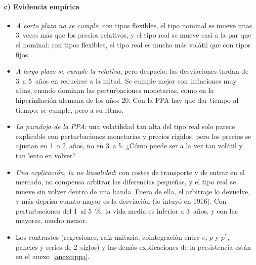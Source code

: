 \documentclass[11pt]{article}
\begin{document}
\paragraph{c) Evidencia empírica}
\begin{itemize}
\item \emph{A corto plazo no se cumple}: con tipos flexibles, el tipo nominal se mueve unas 3~veces más que los precios relativos, y el tipo real se mueve casi a la par que el nominal\nocite{Mussa1984Theory}; con tipos flexibles, el tipo real es mucho más volátil que con tipos fijos\nocite{Mussa1986Nominal}.
\item \emph{A largo plazo se cumple la relativa}, pero despacio: las desviaciones tardan de 3~a 5~años en reducirse a la mitad\nocite{Rogoff1996PPA,TaylorTaylor2004PPP}. Se cumple mejor con inflaciones muy altas, cuando dominan las perturbaciones monetarias, como en la hiperinflación alemana de los años 20\nocite{Frenkel1978PPP}. Con la PPA hay que dar tiempo al tiempo: se cumple, pero a su ritmo.
\item \emph{La paradoja de la PPA}\nocite{Rogoff1996PPA}: una volatilidad tan alta del tipo real solo parece explicable con perturbaciones monetarias y precios rígidos, pero los precios se ajustan en 1~o 2~años, no en 3~a 5. ¿Cómo puede ser a la vez tan volátil y tan lento en volver?
\item \emph{Una explicación, la no linealidad}: con costes de transporte y de entrar en el mercado, no compensa arbitrar las diferencias pequeñas, y el tipo real se mueve sin volver dentro de una banda. Fuera de ella, el arbitraje lo devuelve, y más deprisa cuanto mayor es la desviación (lo intuyó  en 1916). Con perturbaciones del 1~al 5~\%, la vida media es inferior a 3~años, y con las mayores, mucho menor\nocite{TaylorPeelSarno2001Nonlinear,TaylorTaylor2004PPP}.
\item Los contrastes (regresiones, raíz unitaria, cointegración entre $e$, $p$ y $p^*$, paneles y series de 2~siglos) y las demás explicaciones de la persistencia están en el anexo~\ref{anexo:ppa}.
\end{itemize}
\end{document}
